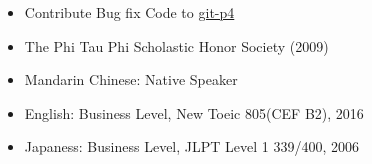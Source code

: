 \documentclass[a4paper,12pt]{memoir} %
\begin{document}
{\begin{itemize}
    \item Contribute Bug fix Code to 
    \href{https://github.com/git/git/pull/977}{git-p4} 

  \end{itemize}

}

\Sep %
\Sep %
\Sep %



\begin{itemize}
  \item The Phi Tau Phi Scholastic Honor Society (2009)
\end{itemize}


\Sep %
\Sep %
\Sep %

\begin{itemize}
  \item Mandarin Chinese: Native Speaker
  \item English: Business Level, New Toeic 805(CEF B2), 2016
  \item Japaness: Business Level, JLPT Level 1 339/400, 2006
\end{itemize}


\Sep %
\Sep %
\Sep %
\end{document}
